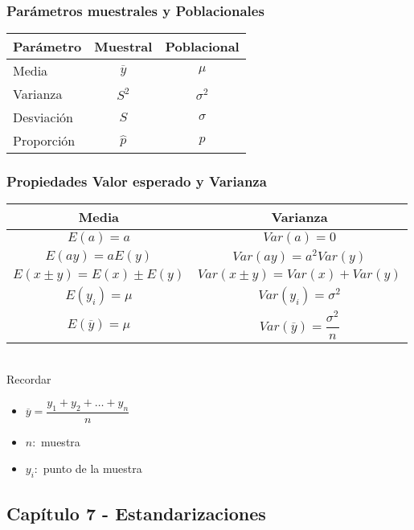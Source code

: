\subsubsection{Parámetros muestrales y Poblacionales}

\begin{tabular}{lcc}
	\hline \hline
	Parámetro & Muestral & Poblacional\\
	\hline
	Media & $\overline{y}$ & $\mu$\\
	Varianza & $S^2$ & $\sigma^2$\\
	Desviación & $S$ & $\sigma $\\
	Proporción & $\hat{p}$ & $p$\\
	\hline
\end{tabular}



\subsubsection{Propiedades Valor esperado y Varianza}
\begin{tabular}{cc}
	\hline \hline
	Media & Varianza\\
	\hline
	$E(a)=a$ & $Var(a)=0$\\
	$E(ay)=aE(y)$ & $Var(ay)=a^2Var(y)$\\
	$E(x \pm y)=E(x) \pm E(y)$ & $Var(x \pm y)=Var(x) + Var(y) $\\
	$E(y_i)=\mu$ & $Var(y_i)=\sigma^2$\\
	 $E(\overline{y})=\mu$ & $Var(\overline{y})=\dfrac{\sigma^2}{n}$\\
	\hline
\end{tabular}\\

Recordar

\begin{itemize}
	\item $\overline{y}=\dfrac{y_1+y_2+\dots+y_n}{n}$
	\item $n:$ muestra
	\item $y_i:$ punto de la muestra
\end{itemize}

\subsection{Capítulo 7 - Estandarizaciones}

